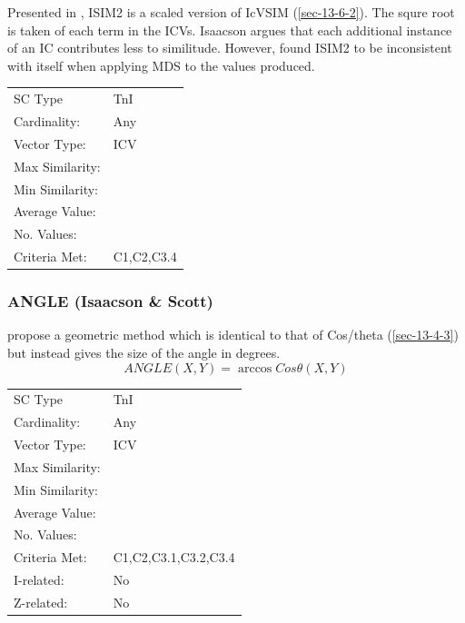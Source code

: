 \documentclass{article}
\begin{document}
Presented in \citet{Isaacson1996}, ISIM2 is a scaled version of IcVSIM
(\ref{sec-13-6-2}). The squre root is taken of each term in the ICVs. Isaacson
argues that each additional instance of an IC contributes less to
similitude. However, \citet{Samplaski2005a} found ISIM2 to be
inconsistent with itself when applying MDS to the values produced.

\begin{center}
\begin{tabular}{ll}
 SC Type          &  TnI         \\
 Cardinality:     &  Any         \\
 Vector Type:     &  ICV         \\
 Max Similarity:  &              \\
 Min Similarity:  &              \\
 Average Value:   &              \\
 No. Values:      &              \\
 Criteria Met:    &  C1,C2,C3.4  \\
\end{tabular}
\end{center}
\subsubsection{ANGLE (Isaacson \& Scott)}
\label{sec-13-6-4}

\citet{Scott1998} propose a geometric method which is identical to
that of Cos/theta (\ref{sec-13-4-3}) but instead gives the size of the
angle in degrees. $$ANGLE(X,Y) = \arccos{Cos\theta(X,Y)}$$

\begin{center}
\begin{tabular}{ll}
 SC Type          &  TnI                   \\
 Cardinality:     &  Any                   \\
 Vector Type:     &  ICV                   \\
 Max Similarity:  &                        \\
 Min Similarity:  &                        \\
 Average Value:   &                        \\
 No. Values:      &                        \\
 Criteria Met:    &  C1,C2,C3.1,C3.2,C3.4  \\
 I-related:       &  No                    \\
 Z-related:       &  No                    \\
\end{tabular}
\end{center}
\end{document}
